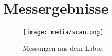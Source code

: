\documentclass[12pt, oneside, a4paper, \docLanguage]{report}
\begin{document}
\section{Messergebnisse}
\label{chap:APPENDIX_MEASUREMENT_SOURCE}
\begin{figure}[hbt!]
	\centering\small
	\texttt{[image: media/scan.png]}
	\caption{Messungen aus dem Labor}
	\label{fig:Messungen aus dem Labor}
\end{figure}

%
%
\addtocounter{chapter}{1}
\setcounter{section}{1}


\end{document}
